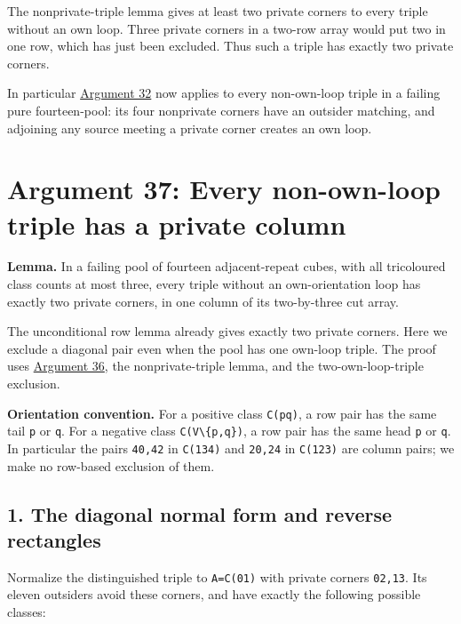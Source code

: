 \documentclass[
  10pt,
]{article}
\begin{document}
The nonprivate-triple lemma gives at least two private corners to every
triple without an own loop. Three private corners in a two-row array
would put two in one row, which has just been excluded. Thus such a
triple has exactly two private corners.

In particular \protect\hyperlink{arg-32}{Argument 32} now applies to
every non-own-loop triple in a failing pure fourteen-pool: its four
nonprivate corners have an outsider matching, and adjoining any source
meeting a private corner creates an own loop.

\hypertarget{arg-37}{%
\section{Argument 37: Every non-own-loop triple has a private
column}\label{arg-37}}

\textbf{Lemma.} In a failing pool of fourteen adjacent-repeat cubes,
with all tricoloured class counts at most three, every triple without an
own-orientation loop has exactly two private corners, in one column of
its two-by-three cut array.

The unconditional row lemma already gives exactly two private corners.
Here we exclude a diagonal pair even when the pool has one own-loop
triple. The proof uses \protect\hyperlink{arg-36}{Argument 36}, the
nonprivate-triple lemma, and the two-own-loop-triple exclusion.

\textbf{Orientation convention.} For a positive class \texttt{C(pq)}, a
row pair has the same tail \texttt{p} or \texttt{q}. For a negative
class \texttt{C(V\textbackslash{}\{p,q\})}, a row pair has the same head
\texttt{p} or \texttt{q}. In particular the pairs \texttt{40,42} in
\texttt{C(134)} and \texttt{20,24} in \texttt{C(123)} are column pairs;
we make no row-based exclusion of them.

\hypertarget{the-diagonal-normal-form-and-reverse-rectangles}{%
\subsection*{1. The diagonal normal form and reverse
rectangles}\label{the-diagonal-normal-form-and-reverse-rectangles}}

Normalize the distinguished triple to \texttt{A=C(01)} with private
corners \texttt{02,13}. Its eleven outsiders avoid these corners, and
have exactly the following possible classes:
\end{document}
